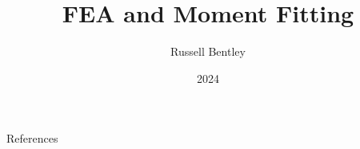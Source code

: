 \documentclass{beamer}
\title{FEA and Moment Fitting}
\author{Russell Bentley}
\institute{Stony Brook}
\date{2024}
\begin{document}
%

\frame{\titlepage}















%





\begin{frame}[allowframebreaks]{References}
    \tiny
    \printbibliography
\end{frame}
\end{document}
